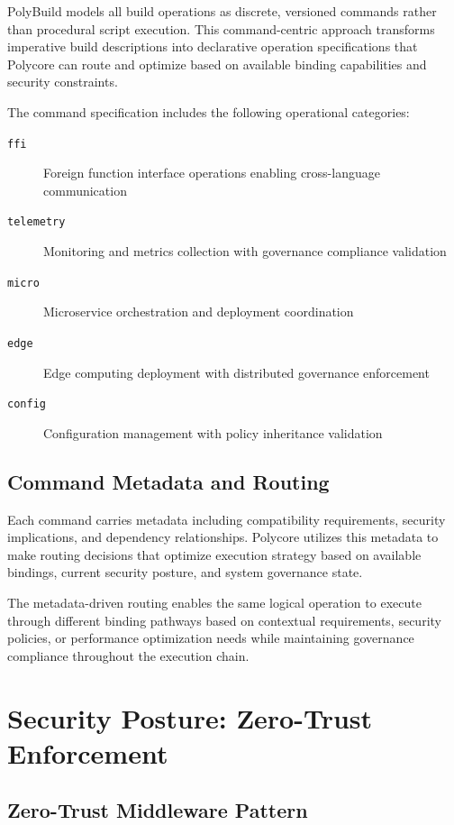 PolyBuild models all build operations as discrete, versioned commands rather than procedural script execution. This command-centric approach transforms imperative build descriptions into declarative operation specifications that Polycore can route and optimize based on available binding capabilities and security constraints.

The command specification includes the following operational categories:

\begin{description}
\item[\texttt{ffi}] Foreign function interface operations enabling cross-language communication
\item[\texttt{telemetry}] Monitoring and metrics collection with governance compliance validation
\item[\texttt{micro}] Microservice orchestration and deployment coordination
\item[\texttt{edge}] Edge computing deployment with distributed governance enforcement
\item[\texttt{config}] Configuration management with policy inheritance validation
\end{description}

\subsection{Command Metadata and Routing}

Each command carries metadata including compatibility requirements, security implications, and dependency relationships. Polycore utilizes this metadata to make routing decisions that optimize execution strategy based on available bindings, current security posture, and system governance state.

The metadata-driven routing enables the same logical operation to execute through different binding pathways based on contextual requirements, security policies, or performance optimization needs while maintaining governance compliance throughout the execution chain.

\section{Security Posture: Zero-Trust Enforcement}

\subsection{Zero-Trust Middleware Pattern}

